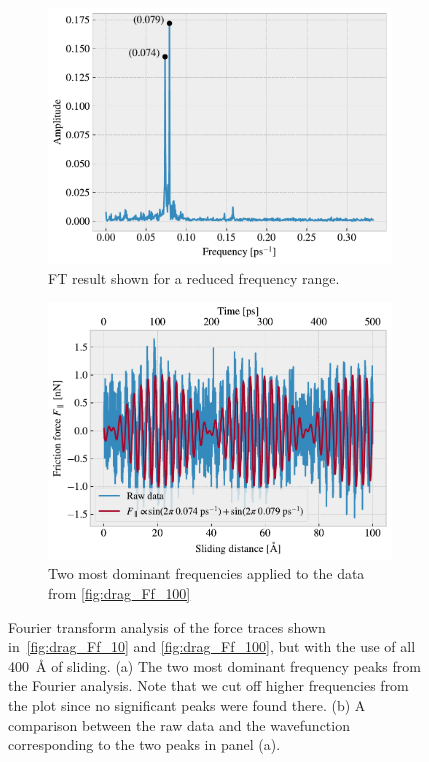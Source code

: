 \begin{figure}[H]
  \centering
  \begin{subfigure}[t]{0.49\textwidth}
    \centering
    \includegraphics[width=\textwidth]{figures/baseline/ft_zoom.pdf}
    \caption{FT result shown for a reduced frequency range.}
    \label{fig:ft_a}
  \end{subfigure}
  \hfill
  \begin{subfigure}[t]{0.49\textwidth}
      \centering
      \includegraphics[width=\textwidth]{figures/baseline/ft_sine.pdf}
      \caption{Two most dominant frequencies applied to the data from \cref{fig:drag_Ff_100}}
      \label{fig:ft_b}
  \end{subfigure}
  \caption{Fourier transform analysis of the force traces shown in~\cref{fig:drag_Ff_10} and \cref{fig:drag_Ff_100}, but with the use of all \SI{400}{Å} of sliding. (a) The two most dominant frequency peaks from the Fourier analysis. Note that we cut off higher frequencies from the plot since no significant peaks were found there. (b) A comparison between the raw data and the wavefunction corresponding to the two peaks in panel (a).}
  \label{fig:ft}
\end{figure}


